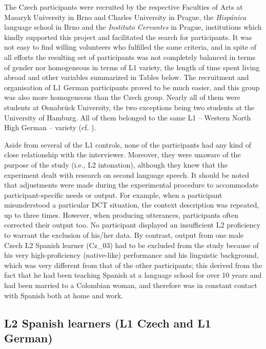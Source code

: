 The Czech participants were recruited by the respective Faculties of Arts at Masaryk University in Brno and Charles University in Prague, the \textit{Hispánica} language school in Brno and the \textit{Instituto Cervantes} in Prague, institutions which kindly supported this project and facilitated the search for participants. It was not easy to find willing volunteers who fulfilled the same criteria, and in spite of all efforts the resulting set of participants was not completely balanced in terms of gender nor homogeneous in terms of L1 variety, the length of time spent living abroad and other variables summarized in Tables below. The recruitment and organisation of L1 German participants proved to be much easier, and this group was also more homogeneous than the Czech group. Nearly all of them were students at Osnabrück University, the two exceptions being two students at the University of Hamburg. All of them belonged to the same L1 -- Western North High German -- variety (cf. ).



Aside from several of the L1 controls, none of the participants had any kind of close relationship with the interviewer. Moreover, they were unaware of the purpose of the study (i.e., L2 intonation), although they knew that the experiment dealt with research on second language speech. It should be noted that adjustments were made during the experimental procedure to accommodate par\-tic\-i\-pant-specific needs or output. For example, when a participant misunderstood a particular DCT situation, the context description was repeated, up to three times. However, when producing utterances, participants often corrected their output too. No participant displayed an insufficient L2 proficiency to warrant the exclusion of his/her data. By contrast, output from one male Czech L2 Spanish learner (Cz\_03) had to be excluded from the study because of his very high-proficiency (native-like) performance and his linguistic background, which was very different from that of the other participants; this derived from the fact that he had been teaching Spanish at a language school for over 10 years and had been married to a Colombian woman, and therefore was in constant contact with Spanish both at home and work.


\subsection{L2 Spanish learners (L1 Czech and L1 German)}\label{sec:3.2.1}\largerpage[2]

